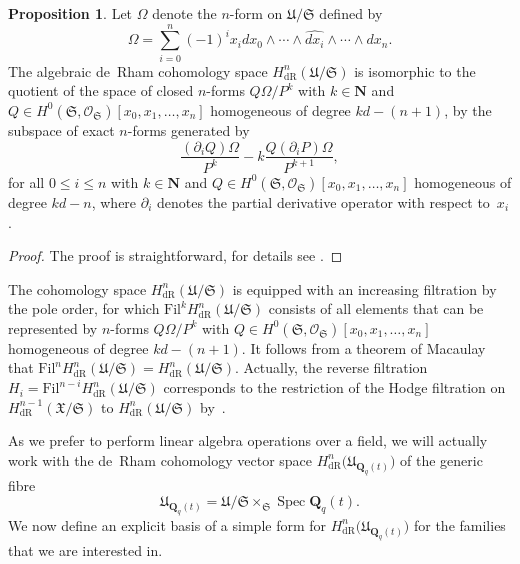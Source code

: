 \documentclass[a4paper,11pt]{article}
\numberwithin{equation}{section}
\newcommand{\NN}{\mathbf{N}} %
\newcommand{\QQ}{\mathbf{Q}} %
\DeclareMathOperator{\Spec}{Spec}        %
\providecommand{\HdR}{H_{\text{dR}}}    %
\theoremstyle{definition}
\newtheorem{prop}[thm]{Proposition}
\begin{document}
\begin{prop}
Let $\Omega$ denote the $n$-form on $\mathfrak{U}/\mathfrak{S}$ defined by 
\begin{equation*}
\Omega = \sum_{i=0}^n (-1)^i x_i d x_0 \wedge \dotsb \wedge \widehat{d x_i} \wedge \dotsb \wedge d x_n.
\end{equation*}
The algebraic de~Rham cohomology space $\HdR^{n}(\mathfrak{U}/\mathfrak{S})$ 
is isomorphic to the quotient of the space of closed $n$-forms 
$Q \Omega / P^k$ with $k \in \NN$ and 
$Q \in H^0(\mathfrak{S},\mathcal{O}_{\mathfrak{S}})[x_0, x_1, \dotsc, x_n]$ 
homogeneous of degree $k d - (n + 1)$, by the subspace of exact $n$-forms 
generated by
\begin{equation*} 
\frac{(\partial_i Q) \Omega}{P^k} - k \frac{Q (\partial_i P) \Omega}{P^{k+1}},
\end{equation*}
for all $0 \leq i \leq n$ with $k \in \NN$ and 
$Q \in H^0(\mathfrak{S}, \mathcal{O}_{\mathfrak{S}})[x_0, x_1, \dotsc, x_n]$ 
homogeneous of degree $kd-n$, where $\partial_i$ denotes the partial 
derivative operator with respect to~$x_i$.
\end{prop}

\begin{proof}
The proof is straightforward, for details see \citep{Griffiths1969}.
\end{proof}

The cohomology space $\HdR^{n}(\mathfrak{U}/\mathfrak{S})$ is 
equipped with an increasing filtration by the pole order, for which 
$\mbox{Fil}^k \HdR^{n}(\mathfrak{U}/\mathfrak{S})$ consists of all elements 
that can be represented by $n$-forms $Q \Omega / P^k$ with 
$Q \in H^0(\mathfrak{S},\mathcal{O}_{\mathfrak{S}})[x_0, x_1, \dotsc, x_n]$ 
homogeneous of degree $kd - (n + 1)$.  It follows from a theorem of 
Macaulay~\citep[\S 4, (4.11)]{Griffiths1969} that 
$\mbox{Fil}^n \HdR^{n}(\mathfrak{U}/\mathfrak{S}) = \HdR^{n}(\mathfrak{U}/\mathfrak{S})$. 
Actually, the reverse filtration $H_i=\mbox{Fil}^{n-i} \HdR^{n}(\mathfrak{U}/\mathfrak{S})$
corresponds to the restriction of the Hodge filtration on 
$\HdR^{n-1}(\mathfrak{X}/\mathfrak{S})$ to $\HdR^{n}(\mathfrak{U}/\mathfrak{S})$ 
by~\citep{Griffiths1969}.

As we prefer to perform linear 
algebra operations over a field, we will actually work with the de~Rham 
cohomology vector space $\HdR^{n}\bigl(\mathfrak{U}_{\QQ_q(t)}\bigr)$ of 
the generic fibre 
\[
\mathfrak{U}_{\QQ_q(t)} = \mathfrak{U}/\mathfrak{S} \times_{\mathfrak{S}} \Spec \QQ_q(t).
\] 
We now define an explicit basis of a simple form for 
$\HdR^{n}\bigl(\mathfrak{U}_{\QQ_q(t)}\bigr)$ 
for the families that we are interested in.
\end{document}
